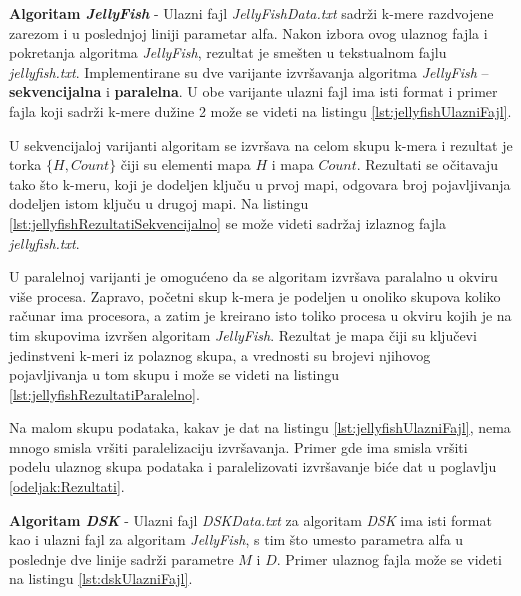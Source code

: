 \documentclass[12pt,oneside]{memoir}
\begin{document}
\textbf{Algoritam \textit{JellyFish}} - Ulazni fajl \textit{JellyFishData.txt} sadrži k-mere razdvojene zarezom i u poslednjoj liniji parametar alfa. Nakon izbora ovog ulaznog fajla i pokretanja algoritma \textit{JellyFish}, rezultat je smešten u tekstualnom fajlu \textit{jellyfish.txt}. Implementirane su dve varijante izvršavanja algoritma \textit{JellyFish} -- \textbf{sekvencijalna} i \textbf{paralelna}. U obe varijante ulazni fajl ima isti format i primer fajla koji sadrži k-mere dužine 2 može se videti na listingu \ref{lst:jellyfishUlazniFajl}.



U sekvencijaloj varijanti algoritam se izvršava na celom skupu k-mera i rezultat je torka $\{H, Count\}$ čiji su elementi mapa $H$ i mapa $Count$. Rezultati se očitavaju tako što k-meru, koji je dodeljen ključu u prvoj mapi, odgovara broj pojavljivanja dodeljen istom ključu u drugoj mapi. Na listingu \ref{lst:jellyfishRezultatiSekvencijalno} se može videti sadržaj izlaznog fajla \textit{jellyfish.txt}.



U paralelnoj varijanti je omogućeno da se algoritam izvršava paralalno u okviru više procesa. Zapravo, početni skup k-mera je podeljen u onoliko skupova koliko računar ima procesora, a zatim je kreirano isto toliko procesa u okviru kojih je na tim skupovima izvršen algoritam \textit{JellyFish}. Rezultat je mapa čiji su ključevi jedinstveni k-meri iz polaznog skupa, a vrednosti su brojevi njihovog pojavljivanja u tom skupu i može se videti na listingu \ref{lst:jellyfishRezultatiParalelno}.



Na malom skupu podataka, kakav je dat na listingu \ref{lst:jellyfishUlazniFajl}, nema mnogo smisla vršiti paralelizaciju izvršavanja. Primer gde ima smisla vršiti podelu ulaznog skupa podataka i paralelizovati izvršavanje biće dat u poglavlju \ref{odeljak:Rezultati}.

\textbf{Algoritam \textit{DSK}} - Ulazni fajl \textit{DSKData.txt} za algoritam \textit{DSK} ima isti format kao i ulazni fajl za algoritam \textit{JellyFish}, s tim što umesto parametra alfa u poslednje dve linije sadrži parametre $M$ i $D$. Primer ulaznog fajla može se videti na listingu \ref{lst:dskUlazniFajl}.
\end{document}

